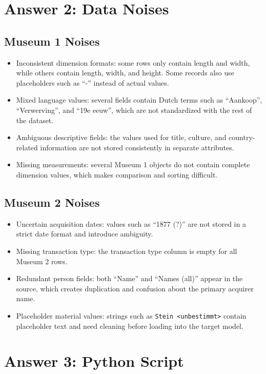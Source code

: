 \documentclass[12pt,a4paper]{report}
\begin{document}
\chapter*{Answer 2: Data Noises}
\section*{Museum 1 Noises}
\begin{itemize}
  \item Inconsistent dimension formats: some rows only contain length and width, while others contain length, width, and height. Some records also use placeholders such as ``-'' instead of actual values.
  \item Mixed language values: several fields contain Dutch terms such as ``Aankoop'', ``Verwerving'', and ``19e eeuw'', which are not standardized with the rest of the dataset.
  \item Ambiguous descriptive fields: the values used for title, culture, and country-related information are not stored consistently in separate attributes.
  \item Missing measurements: several Museum 1 objects do not contain complete dimension values, which makes comparison and sorting difficult.
\end{itemize}

\section*{Museum 2 Noises}
\begin{itemize}
  \item Uncertain acquisition dates: values such as ``1877 (?)'' are not stored in a strict date format and introduce ambiguity.
  \item Missing transaction type: the transaction type column is empty for all Museum 2 rows.
  \item Redundant person fields: both ``Name'' and ``Names (all)'' appear in the source, which creates duplication and confusion about the primary acquirer name.
  \item Placeholder material values: strings such as \texttt{Stein <unbestimmt>} contain placeholder text and need cleaning before loading into the target model.
\end{itemize}


\chapter*{Answer 3: Python Script}

\end{document}
